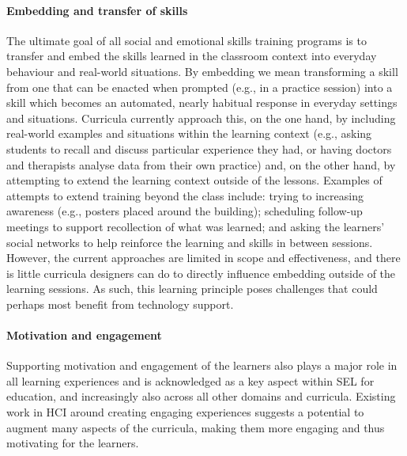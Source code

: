 \documentclass[prodmode,acmtochi]{acmsmall}
\newcommand{\GeraldineTODO}[1]{}
\begin{document}
\paragraph{Embedding and transfer of skills} The ultimate goal of all social and emotional skills training programs is to transfer and embed the skills learned in the classroom context into everyday behaviour and real-world situations. By embedding we mean transforming a skill from one that can be enacted when prompted (e.g., in a practice session) into a skill which becomes an automated, nearly habitual response  in everyday settings and situations.  
        Curricula currently approach this, on the one hand, by including real-world examples and situations within the learning context (e.g., asking students to recall and discuss particular experience they had, or having doctors and therapists analyse data from their own practice) and, on the other hand, by attempting to extend the learning context outside of the lessons. Examples of attempts to extend training beyond the class include: trying to increasing awareness (e.g., posters placed around the building); scheduling follow-up meetings to support recollection of what was learned; and asking the learners' social networks to help reinforce the learning and skills in between sessions.
        However, the current approaches are limited in scope and effectiveness, and there is little curricula designers can do to directly influence embedding outside of the learning sessions. As such, this learning principle poses challenges that could perhaps most benefit from technology support. 

\paragraph{Motivation and engagement} Supporting motivation and engagement of the learners also plays a major role in all learning experiences and is acknowledged as a key aspect within SEL for education, and increasingly also across all other domains and curricula. Existing work in HCI around creating engaging experiences suggests a potential to augment many aspects of the curricula, making them more engaging and thus motivating for the learners.
\GeraldineTODO{G: breaks the pattern as previous aspects haven't really mentioned HCI work in this way - lose here and replace with how motivation is currently handled???} 
\end{document}
